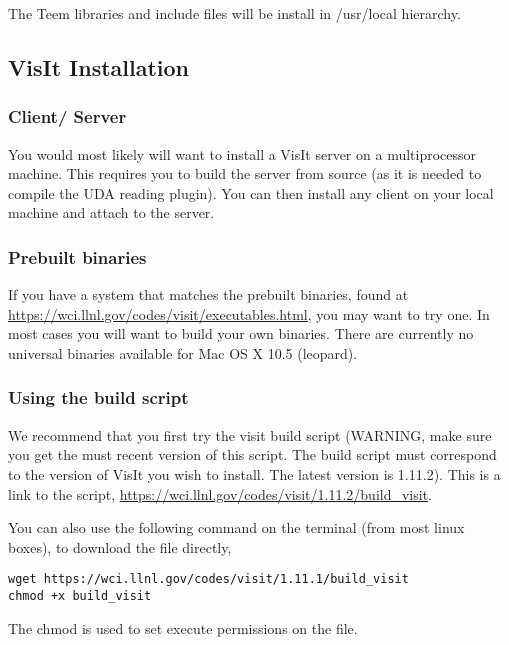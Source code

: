 The Teem libraries and include files will be install in /usr/local hierarchy.

\subsection{VisIt Installation}

\subsubsection{Client/ Server}
\label{sec:ClientServer}

You would most likely will want to install a VisIt server on a multiprocessor machine. This requires you to build the server from source (as it is needed to compile the UDA reading plugin). You can then install any client on your local machine and attach to the server. 

\subsubsection{Prebuilt binaries}
\label{sec:PrebuiltBinaries}

If you have a system that matches the prebuilt binaries, found at \url{https://wci.llnl.gov/codes/visit/executables.html}, you may want to try one. In most cases you will want to build your own binaries. There are currently no universal binaries available for Mac OS X 10.5 (leopard).

\subsubsection{Using the build script}
\label{sec:UsingTheBuildScript}

We recommend that you first try the visit build script (WARNING, make sure you get the must recent version of this script. The build script must correspond to the version of VisIt you wish to install. The latest version is 1.11.2). This is a link to the script, \url{https://wci.llnl.gov/codes/visit/1.11.2/build\_visit}.

You can also use the following command on the terminal (from most linux boxes), to download the file directly, 

\begin{Verbatim}[fontsize=\footnotesize]
wget https://wci.llnl.gov/codes/visit/1.11.1/build_visit
chmod +x build_visit
\end{Verbatim}

\normalfont The chmod is used to set execute permissions on the file.


